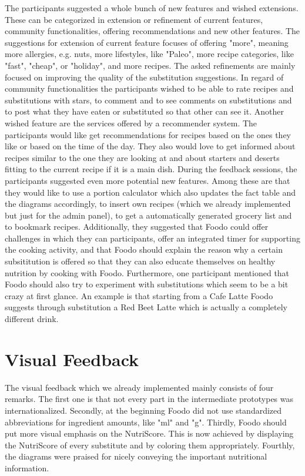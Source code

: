 The participants suggested a whole bunch of new features and wished extensions. These can be categorized in extension or refinement of current features, community functionalities, offering recommendations and new other features. The suggestions for extension of current feature focuses of offering "more", meaning more allergies, e.g. nuts, more lifestyles, like "Paleo", more recipe categories, like "fast", "cheap", or "holiday", and more recipes. The asked refinements are mainly focused on improving the quality of the substitution suggestions. In regard of community functionalities the participants wished to be able to rate recipes and substitutions with stars, to comment and to see comments on substitutions and to post what they have eaten or substituted so that other can see it. Another wished feature are the services offered by a recommender system. The participants would like get recommendations for recipes based on the ones they like or based on the time of the day. They also would love to get informed about recipes similar to the one they are looking at and about starters and deserts fitting to the current recipe if it is a main dish. During the feedback  sessions, the participants suggested even more potential new features. Among these are that they would like to use a portion calculator which also updates the fact table and the diagrams accordingly, to insert own recipes (which we already implemented but just for the admin panel), to get a automatically generated grocery list and to bookmark recipes. Additionally, they suggested that Foodo could offer challenges in which they can participants, offer an integrated timer for supporting the cooking activity, and that Foodo should explain the reason why a certain subsititution is offered so that they can also educate themselves on healthy nutrition by cooking with Foodo. Furthermore, one participant mentioned that Foodo should also try to experiment with substitutions which seem to be a bit crazy at first glance. An example is that starting from a Cafe Latte Foodo suggests through substitution a Red Beet Latte which is actually a completely different drink.
    
\section{Visual Feedback}


The visual feedback which we already implemented mainly consists of four remarks. The first one is that not every part in the intermediate prototypes was internationalized. Secondly, at the beginning Foodo did not use standardized abbreviations for ingredient amounts, like "ml" and "g". Thirdly, Foodo should put more visual emphasis on the NutriScore. This is now achieved by displaying the NutriScore of every substitute and by coloring them appropriately. Fourthly, the diagrams were praised for nicely conveying the important nutritional information. 

